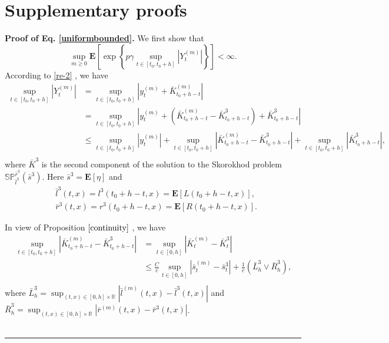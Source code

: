 \documentclass[10pt]{article}%
\numberwithin{equation}{section}
\newenvironment{proof}[1][Proof]{\noindent \textbf{#1.} }{\  \rule{0.5em}{0.5em}}
\begin{document}
\renewcommand\thesection{Appendix B}
\section{Supplementary proofs}\label{append:B}
\renewcommand\thesection{B}

\begin{proof}[Proof of Eq. \eqref{uniformbounded}]
We first show that $$\sup_{m\geq 0}\mathbf{E}\left [ \exp\left \{ p\gamma\sup_{t \in[t_{0}, t_{0}+h]}\left | Y_t^{(m)} \right |  \right \}   \right ] <\infty.$$
According to  \eqref{re-2} , we have   
$$
\begin{aligned}
\sup_{t\in[t_0,t_0+h]}\left|Y^{(m)}_t\right|&=\sup_{t\in[t_0,t_0+h]}\left|y^{(m)}_t+\bar{K}^{(m)}_{t_0+h-t}\right|\\
  &=\sup_{t\in[t_0,t_0+h]}\left|y^{(m)}_t+(\bar{K}^{(m)}_{t_0+h-t}-\bar{K}^{3}_{t_0+h-t})+\bar{K}^{3}_{t_0+h-t}\right|\\
  &\leq\sup_{t\in[t_0,t_0+h]}\left|y^{(m)}_t\right|+\sup_{t\in[t_0,t_0+h]}\left|\bar{K}^{(m)}_{t_0+h-t}-\bar{K}^{3}_{t_0+h-t}\right|+\sup_{t\in[t_0,t_0+h]}\left|\bar{K}^{3}_{t_0+h-t}\right|\text {,}\\
\end{aligned}
$$
where $\bar{K}^3$ is the second component of the solution to the Skorokhod problem $\mathbb{SP}_{\bar{l}^3}^{\bar{r}^3}(\bar{s}^3)$. Here $\bar{s}^3=\mathbf{E}[\eta]$ and 
\begin{align*}
&\bar{l}^3(t,x)=l^3(t_0+h-t,x)=\mathbf{E}\left[L(t_0+h-t,x)\right], \\
&\bar{r}^3(t,x)=r^3(t_0+h-t,x)=\mathbf{E}\left[R(t_0+h-t,x)\right].
\end{align*}

In view of Proposition $\ref{continuity}$ , we have
$$
\begin{aligned}
\sup_{t\in[t_0,t_0+h]}\left|\bar{K}^{(m)}_{t_0+h-t}-\bar{K}^{3}_{t_0+h-t}\right|&=\sup_{t\in[0,h]}\left|\bar{K}^{(m)}_{t}-\bar{K}^{3}_{t}\right|\\
&\leq\frac{C}{c}\sup_{t\in[0,h]}\left|\bar{s}^{(m)}_{t}-\bar{s}^{3}_{t}\right|+\frac{1}{c}\left(\bar{L}^{3}_h\vee\bar{R}^{3}_h\right)\text{,}\\     
\end{aligned}
$$
where $\bar{L}^3_h=\sup_{(t,x)\in[0,h]\times\mathbb{R}}\left|\bar{l}^{(m)}(t,x)-\bar{l}^{3}(t,x)\right|$ and
$\bar{R}^3_h=\sup_{(t,x)\in[0,h]\times\mathbb{R}}\left|\bar{r}^{(m)}(t,x)-\bar{r}^{3}(t,x)\right|$.\\


\end{proof}
\end{document}
